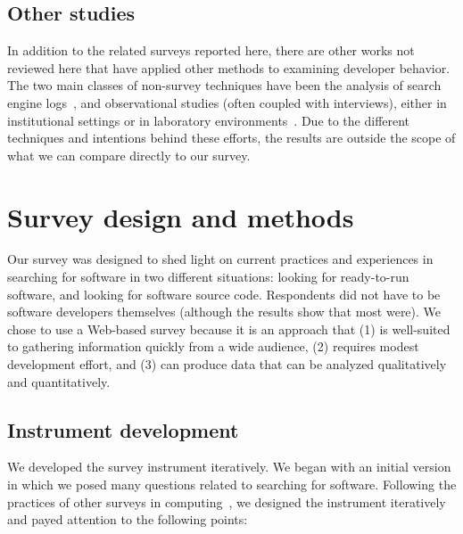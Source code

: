 \documentclass[review]{elsarticle}
\begin{document}
\subsection{Other studies}

In addition to the related surveys reported here, there are other works not reviewed here that have applied other methods to examining developer behavior.  The two main classes of non-survey techniques have been the analysis of search engine logs~\citep{bajrachary_2009, bajracharya2012analyzing, jansen_2006, teevan_2004, brandt2009two, brandt2010example, Li2009751, ge2014developers, volske2015users}, and observational studies (often coupled with interviews), either in institutional settings or in laboratory environments~\citep{sim_2011, brandt2009two, banker1993repository, gallardo2013software, sherif2003barriers, pohthong2001reuse, sim2013controlled, murphyhill2015how, sim2011getting, dabbish_2012}.  Due to the different techniques and intentions behind these efforts, the results are outside the scope of what we can compare directly to our survey.


\section{Survey design and methods}
\label{methods}

Our survey was designed to shed light on current practices and experiences in searching for software in two different situations: looking for ready-to-run software, and looking for software source code.  Respondents did not have to be software developers themselves (although the results show that most were).  We chose to use a Web-based survey because it is an approach that (1) is well-suited to gathering information quickly from a wide audience, (2) requires modest development effort, and (3) can produce data that can be analyzed qualitatively and quantitatively.


\subsection{Instrument development}

We developed the survey instrument iteratively.  We began with an initial version in which we posed many questions related to searching for software.  Following the practices of other surveys in computing~\citep[e.g.,][]{varnellsarjeant2015comparing, kitchenham_2008}, we designed the instrument iteratively and payed attention to the following points:
\end{document}

